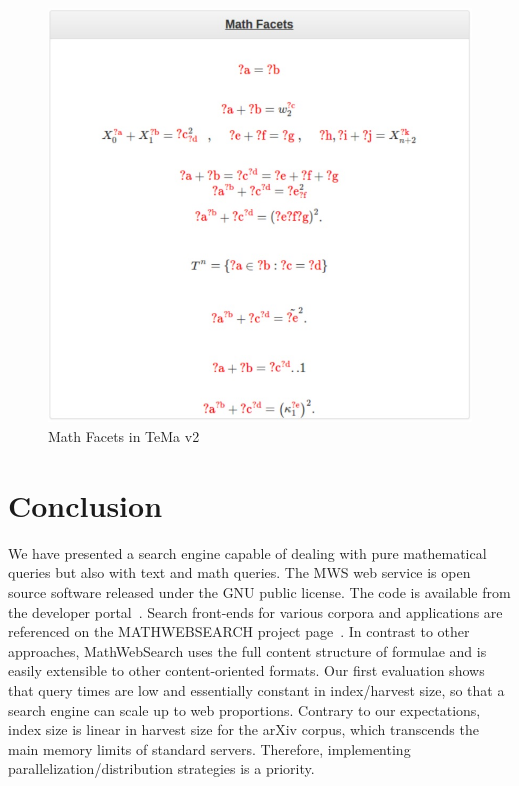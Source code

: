 \documentclass{deliverablereport}
\begin{document}
\begin{figure}[H]
\centering
 \includegraphics[scale=0.8]{figure10.jpg}
 \caption{Math Facets in TeMa v2}
 \label{fig:facets_temav2}
\end{figure}

\section{Conclusion}\label{sec:concl}
We have presented a search engine capable of dealing with pure mathematical queries but
also with text and math queries. The MWS web service is open source software released
under the GNU public license. The code is available from the developer
portal~\cite{MWS-git:on}. Search front-ends for various corpora and applications are
referenced on the MATHWEBSEARCH project page~\cite{MWSProj:on}. In contrast to other
approaches, MathWebSearch uses the full content structure of formulae and is easily
extensible to other content-oriented formats. Our first evaluation shows that query times
are low and essentially constant in index/harvest size, so that a search engine can scale
up to web proportions. Contrary to our expectations, index size is linear in harvest size
for the arXiv corpus, which transcends the main memory limits of standard
servers. Therefore, implementing parallelization/distribution strategies is a
priority. 
\end{document}
